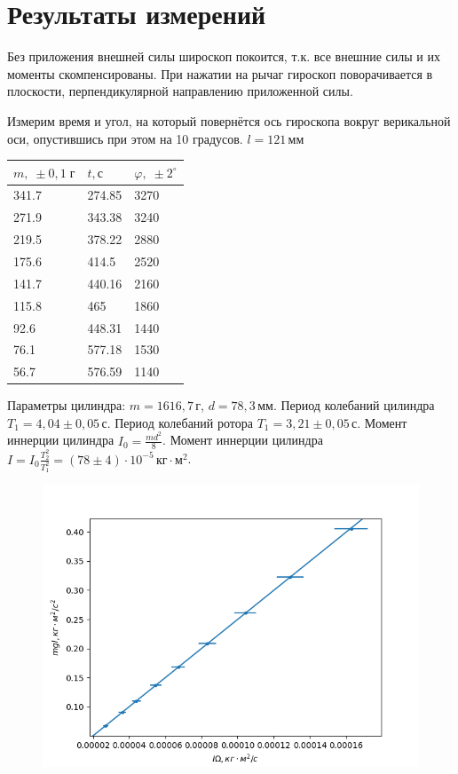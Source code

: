 \section{Результаты измерений}
Без приложения внешней силы широскоп покоится, т.к. все внешние силы и их моменты
скомпенсированы. При нажатии на рычаг гироскоп поворачивается в плоскости, перпендикулярной
направлению приложенной силы.

Измерим время и угол, на который повернётся ось гироскопа вокруг верикальной оси, опустившись
при этом на 10 градусов. $l=121\,\text{мм}$

\begin{table}[!ht]
    \centering
    \begin{tabular}{|l|l|l|}
    \hline
        $m,\;\pm 0{,}1\;\text{г}$ & $t,\text{с}$ & $\varphi,\;\pm 2^{\circ}$ \\ \hline
        341.7 & 274.85 & 3270 \\ \hline
        271.9 & 343.38 & 3240 \\ \hline
        219.5 & 378.22 & 2880 \\ \hline
        175.6 & 414.5 & 2520 \\ \hline
        141.7 & 440.16 & 2160 \\ \hline
        115.8 & 465 & 1860 \\ \hline
        92.6 & 448.31 & 1440 \\ \hline
        76.1 & 577.18 & 1530 \\ \hline
        56.7 & 576.59 & 1140 \\ \hline
    \end{tabular}
\end{table}

Параметры цилиндра: $m=1616{,}7\,\text{г}$, $d=78{,}3\,\text{мм}$.
Период колебаний цилиндра $T_1=4{,}04\pm 0{,}05\,\text{с}$.
Период колебаний ротора $T_1=3{,}21\pm 0{,}05\,\text{с}$.
Момент иннерции цилиндра $I_0=\frac{md^2}{8}$.
Момент иннерции цилиндра $I=I_0\frac{T_2^2}{T_1^2}=\left(78\pm 4\right)\cdot 10^{-5}\,\text{кг}\cdot\text{м}^2$.

\begin{figure}[ht!]
    \centering\includegraphics[width=0.8\linewidth]{img/plotk.png}
\end{figure}

